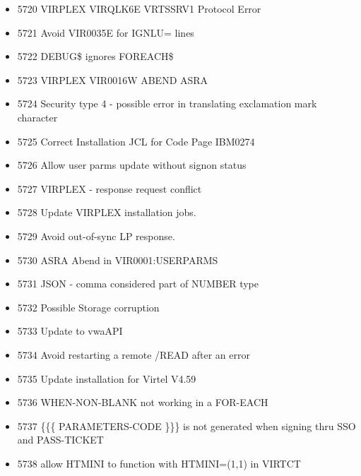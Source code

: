 \documentclass[letterpaper,10pt,english]{sphinxmanual}
\begin{document}
\begin{itemize}
\item {} 
5720 VIRPLEX VIRQLK6E VRTSSRV1 Protocol Error

\item {} 
5721 Avoid VIR0035E for IGNLU= lines

\item {} 
5722 DEBUG\$ ignores FOREACH\$

\item {} 
5723 VIRPLEX VIR0016W ABEND ASRA

\item {} 
5724 Security type 4 - possible error in translating exclamation mark character

\item {} 
5725 Correct Installation JCL for Code Page IBM0274

\item {} 
5726 Allow user parms update without signon status

\item {} 
5727 VIRPLEX - response request conflict

\item {} 
5728 Update VIRPLEX installation jobs.

\item {} 
5729 Avoid out-of-sync LP response.

\item {} 
5730 ASRA Abend in VIR0001:USERPARMS

\item {} 
5731 JSON - comma considered part of NUMBER type

\item {} 
5732 Possible Storage corruption

\item {} 
5733 Update to vwaAPI

\item {} 
5734 Avoid restarting a remote /READ  after an error

\item {} 
5735 Update installation for Virtel V4.59

\item {} 
5736 WHEN-NON-BLANK not working in a FOR-EACH

\item {} 
5737 \{\{\{ PARAMETERS-CODE \}\}\} is not generated when signing thru SSO and PASS-TICKET

\item {} 
5738 allow HTMINI to function with HTMINI=(1,1) in VIRTCT


\end{itemize}
\end{document}
